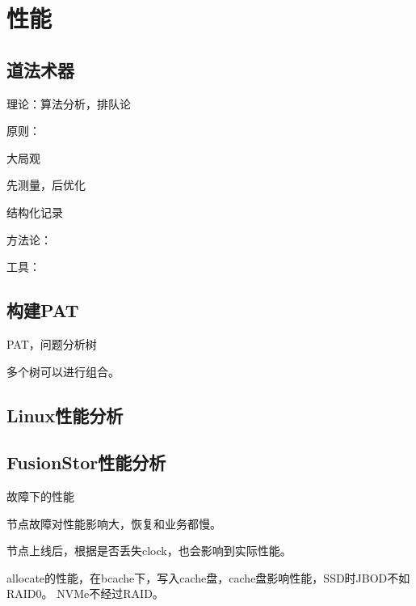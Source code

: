 \chapter{性能}

\section{道法术器}

理论：算法分析，排队论

原则：
\begin{enumbox}
\item 大局观
\item 先测量，后优化
\item 结构化记录
\end{enumbox}

方法论：

工具：

\section{构建PAT}

PAT，问题分析树

多个树可以进行组合。

\section{Linux性能分析}

\section{FusionStor性能分析}

故障下的性能

节点故障对性能影响大，恢复和业务都慢。

节点上线后，根据是否丢失clock，也会影响到实际性能。

allocate的性能，在bcache下，写入cache盘，cache盘影响性能，SSD时JBOD不如RAID0。
NVMe不经过RAID。
